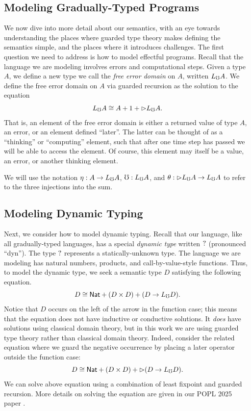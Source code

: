 \documentclass{article}
\theoremstyle{definition}
\theoremstyle{remark}
\begin{document}
\subsection{Modeling Gradually-Typed Programs}

We now dive into more detail about our semantics, with an eye towards
understanding the places where guarded type theory makes defining the semantics
simple, and the places where it introduces challenges. 
%
The first question we need to address is how to model effectful programs. Recall
that the language we are modeling involves errors and computational steps. Given
a type $A$, we define a new type we call the \emph{free error domain} on $A$,
written $L_\mho A$. We define the free error domain on $A$ via guarded recursion as
the solution to the equation
%
\[ L_\mho A \cong A + 1 + {\vartriangleright} L_\mho A. \]
%
That is, an element of the free error domain is either a returned value of type
$A$, an error, or an element defined ``later''. The latter can be thought of as
a ``thinking'' or ``computing'' element, such that after one time step has
passed we will be able to access the element. Of course, this element may itself
be a value, an error, or another thinking element. 


We will use the notation $\eta : A \to L_\mho A$, $\mho : L_\mho A$, and $\theta :
{\vartriangleright} L_\mho A \to L_\mho A$ to refer to the three injections into the sum.


\subsection{Modeling Dynamic Typing}

Next, we consider how to model dynamic typing. Recall that our language, like
all gradually-typed languages, has a special \emph{dynamic type} written ${?}$
(pronounced ``dyn''). The type ${?}$ represents a statically-unknown type. The
language we are modeling has natural numbers, products, and call-by-value-style
functions. Thus, to model the dynamic type, we seek a semantic type $D$
satisfying the following equation. 
%
\[ D \cong \mathsf{Nat} + (D \times D) + (D \to L_\mho D). \]
%
Notice that $D$ occurs on the left of the arrow in the function case; this means
that the equation does not have inductive or conductive solutions. It
\emph{does} have solutions using classical domain theory, but in this work we
are using guarded type theory rather than classical domain theory. 
%
Indeed, consider the related equation where we guard the negative occurrence by
placing a later operator outside the function case:
%
\[ D \cong \mathsf{Nat} + (D \times D) + {\vartriangleright} (D \to L_\mho D). \]
%
We can solve above equation using a combination of least fixpoint and guarded
recursion. More details on solving the equation are given in our POPL 2025 paper
\cite{gtt-sgdt}.
\end{document}
